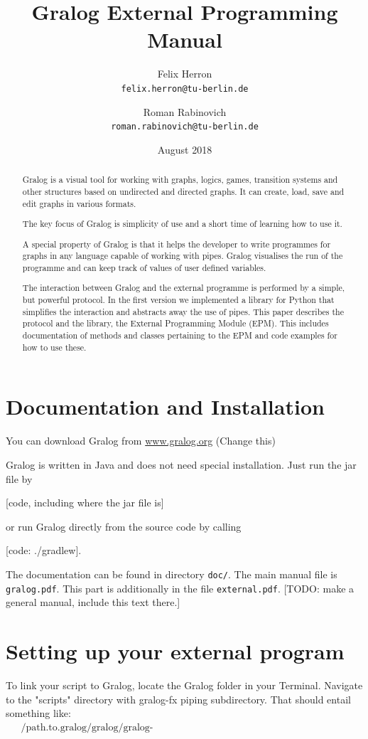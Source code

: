 \documentclass{article}
\title{Gralog External Programming Manual}
\author{Felix Herron\\\texttt{felix.herron@tu-berlin.de} \and Roman
  Rabinovich\\ \texttt{roman.rabinovich@tu-berlin.de}}
\date{August 2018}
\begin{document}
\maketitle


\begin{abstract}
Gralog is a visual tool for working with graphs, logics, games,
transition systems and other structures based on undirected and
directed graphs. It can create, load, save and edit graphs in
various formats.

The key focus of Gralog is simplicity of use and a short time of
learning how to use it.

A special property of Gralog is that it helps the developer to write
programmes for graphs in any language capable of working with
pipes. Gralog visualises the run of the programme and can keep track
of values of user defined variables.

The interaction between Gralog and the external programme is
performed by a simple, but powerful protocol. In the first version
we implemented a library for Python that simplifies the interaction
and abstracts away the use of pipes. This paper describes the
protocol and the library, the External Programming Module (EPM). This
includes documentation of methods and classes pertaining to the
EPM and code examples for how to use these.
\end{abstract}

\section{Documentation and Installation}

You can download Gralog from \url{www.gralog.org} (Change this)

Gralog is written in Java and does not need special installation. Just
run the jar file by

[code, including where the jar file is]

or run Gralog directly from the source code by calling

[code: ./gradlew].

The documentation can be found in directory \texttt{doc/}. The main
manual file is \texttt{gralog.pdf}. This part is additionally in the
file \texttt{external.pdf}. [TODO: make a general manual, include this
text there.]



\section{Setting up your external program}
To link your script to Gralog, locate the Gralog folder in your Terminal. Navigate to the "scripts" directory with gralog-fx piping subdirectory. That should entail something like:
\begin{align*}
&\text{~/path.to.gralog/gralog/gralog-fx/src/main/java/gralog/gralogfx/piping/scripts}
\end{align*}
\end{document}
